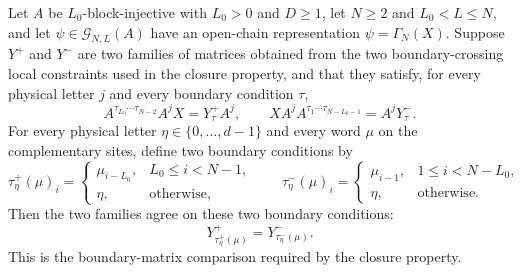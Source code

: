 \begin{theorem}
    \label{thm:wrapped_mirror_witness_agree_chain_ground_space}
    \leanok
    Let $A$ be $L_0$-block-injective with $L_0>0$ and $D\ge1$, let $N\ge2$
    and $L_0<L\le N$, and let
    $\psi\in\mathcal G_{N,L}(A)$ have an open-chain representation
    $\psi=\Gamma_N(X)$.  Suppose $Y^{+}$ and $Y^{-}$ are two families of
    matrices obtained from the two boundary-crossing local constraints used
    in the closure property, and that they satisfy,
    for every physical letter $j$ and every boundary condition $\tau$,
    \[
        A^{\tau_{L_0}\cdots\tau_{N-2}} A^j X
        =
        Y^{+}_{\tau} A^j,
        \qquad
        X A^j A^{\tau_1\cdots\tau_{N-L_0-1}}
        =
        A^j Y^{-}_{\tau}.
    \]
    For every physical letter
    $\eta\in\{0,\ldots,d-1\}$ and every word $\mu$ on the complementary sites,
    define two boundary conditions by
    \[
        \tau^{+}_{\eta}(\mu)_i =
        \begin{cases}
            \mu_{i-L_0}, & L_0\le i<N-1,\\
            \eta,        & \text{otherwise},
        \end{cases}
        \qquad
        \tau^{-}_{\eta}(\mu)_i =
        \begin{cases}
            \mu_{i-1}, & 1\le i<N-L_0,\\
            \eta,      & \text{otherwise}.
        \end{cases}
    \]
    Then the two families agree on these two boundary conditions:
    \[
        Y^{+}_{\tau^{+}_{\eta}(\mu)}
        =
        Y^{-}_{\tau^{-}_{\eta}(\mu)}.
    \]
    This is the boundary-matrix comparison required by the closure property.
\end{theorem}

